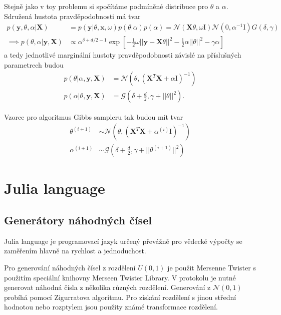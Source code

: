 \documentclass[11pt,oneside,american,czech]{article}
\newcommand{\N}{\mathcal{N}}
\newcommand{\G}{\mathcal{G}}
\newcommand{\half}{\frac{1}{2}}
\newcommand{\id}{\mathrm{I}}
\begin{document}
Stejně jako v toy problemu si spočítáme podmíněné distribuce pro $\theta$ a $\alpha$. Sdružená hustota pravděpodobnosti má tvar
\begin{align*}
	p(\boldsymbol{y}, \theta, \alpha |\boldsymbol{X}) & = p(\boldsymbol{y} | \theta, \boldsymbol{x}, \omega)p(\theta | \alpha)p(\alpha) = \N(\boldsymbol{X} \theta, \omega \id) \N(0,\alpha^{-1} \id) G(\delta, \gamma)  \\
	\implies p(\theta, \alpha |\boldsymbol{y}, \boldsymbol{X}) & \propto \alpha^{\delta + d/2 - 1} \exp \left[ - \half \omega ||\boldsymbol{y} - \boldsymbol{X} \theta ||^2 - \half \alpha || \theta ||^2 - \gamma \alpha  \right]
\end{align*}
a tedy jednotlivé marginální hustoty pravděpodobnosti závislé na příslušných parametrech budou
\begin{align*}
	p(\theta | \alpha, \boldsymbol{y}, \boldsymbol{X}) & = \N \left( \hat{\theta}, \left( \boldsymbol{X}^T \boldsymbol{X} + \alpha \id \right)^{-1} \right) \\
	p(\alpha | \theta, \boldsymbol{y}, \boldsymbol{X}) & = \G \left(\delta + \frac{d}{2}, \gamma + ||\theta||^2 \right).
\end{align*}

Vzorce pro algoritmus Gibbs sampleru tak budou mít tvar
\begin{align}
	\theta^{(i+1)} & \sim \N \left( \hat{\theta}, \left( \boldsymbol{X}^T \boldsymbol{X} + \alpha^{(i)} \id \right)^{-1} \right) \label{Eq: Gibbs linreg m} \\
	\alpha^{(i+1)} & \sim \G \left(\delta + \frac{d}{2}, \gamma + ||\theta^{(i+1)}||^2 \right) \label{Eq: Gibbs linreg s}
\end{align}

\section{Julia language}
\subsection{Generátory náhodných čísel}

Julia language je programovací jazyk určený převážně pro vědecké výpočty se zaměřením hlavně na rychlost a jednoduchost.

Pro generování náhodných čísel z rozdělení $U(0,1)$ je použit Mersenne Twister s použitím speciální knihovny Merseen Twister Library. %
V protokolu je nutné generovat náhodná čísla z několika různých rozdělení. Generování z $\N(0,1)$ probíhá pomocí Zigurratova algoritmu. Pro získání rozdělení s jinou střední hodnotou nebo rozptylem jsou použity známé transformace rozdělení.
\end{document}
